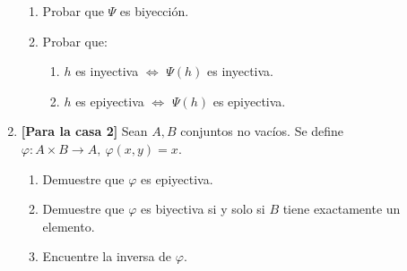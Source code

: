 \documentclass[letterpaper,11pt]{article}
\theoremstyle{plain}
\begin{document}
\begin{enumerate}[\bf P1.]
        \begin{enumerate}
            \item Probar que $\Psi$ es biyección.
            \item Probar que:
                \begin{enumerate}
                    \item $h$ es inyectiva $\iff$ $\Psi(h)$ es inyectiva.
                    \item $h$ es epiyectiva $\iff$ $\Psi(h)$ es epiyectiva.
                \end{enumerate}
        \end{enumerate}
    
    \item \textbf{[Para la casa 2]} Sean $A,B$ conjuntos no vacíos. Se define $\varphi : A \times B \to A, ~ \varphi(x, y) = x.$
        \begin{enumerate}
            \item Demuestre que $\varphi$ es epiyectiva.
            \item Demuestre que $\varphi$ es biyectiva si y solo si $B$ tiene exactamente un elemento.
            \item Encuentre la inversa de $\varphi$.
        \end{enumerate}
\end{enumerate}
\end{document}
